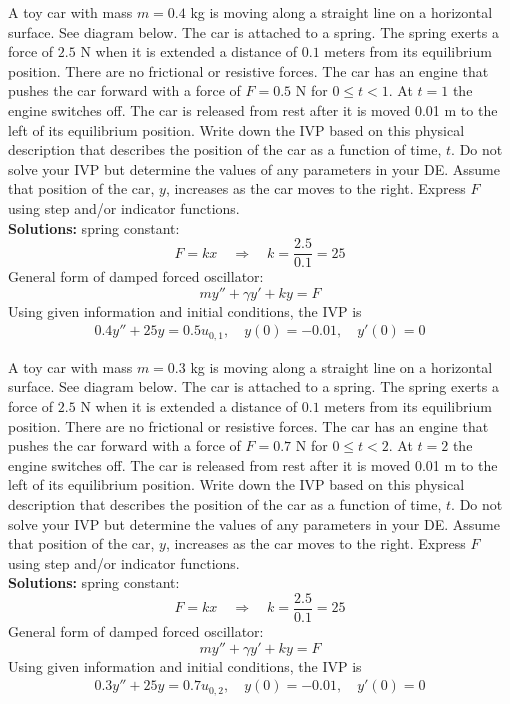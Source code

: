 \ifnum {}
\question[2] A toy car with mass $m = 0.4$ kg is moving along a straight line on a horizontal surface. See diagram below. The car is attached to a spring. The spring exerts a force of $2.5$ N when it is extended a distance of $0.1$ meters from its equilibrium position. There are no frictional or resistive forces. The car has an engine that pushes the car forward with a force of $F = 0.5$ N for $0 \le t < 1$. At $t = 1$ the engine switches off. The car is released from rest after it is moved 0.01 m to the left of its equilibrium position. Write down the IVP based on this physical description that describes the position of the car as a function of time, $t$. Do not solve your IVP but determine the values of any parameters in your DE. Assume that position of the car, $y$, increases as the car moves to the right. Express $F$ using step and/or indicator functions. \\


\ifnum {} {\color{DarkBlue} 
\textbf{Solutions:} spring constant:
$$F = kx \quad \Rightarrow \quad k = \frac{2.5}{0.1} = 25$$
General form of damped forced oscillator:
$$my'' + \gamma y' + ky = F$$
Using given information and initial conditions, the IVP is
\begin{align}
    0.4 y'' + 25y = 0.5u_{0,1}, \quad y(0) = -0.01, \quad y'(0) = 0
\end{align}
} 
\else 
\vfill
\fi
\fi 


\ifnum {}
\question[2] A toy car with mass $m = 0.3$ kg is moving along a straight line on a horizontal surface. See diagram below. The car is attached to a spring. The spring exerts a force of $2.5$ N when it is extended a distance of $0.1$ meters from its equilibrium position. There are no frictional or resistive forces. The car has an engine that pushes the car forward with a force of $F = 0.7$ N for $0 \le t < 2$. At $t = 2$ the engine switches off. The car is released from rest after it is moved 0.01 m to the left of its equilibrium position. Write down the IVP based on this physical description that describes the position of the car as a function of time, $t$. Do not solve your IVP but determine the values of any parameters in your DE. Assume that position of the car, $y$, increases as the car moves to the right. Express $F$ using step and/or indicator functions. \\


\ifnum {} {\color{DarkBlue} 
\textbf{Solutions:} spring constant:
$$F = kx \quad \Rightarrow \quad k = \frac{2.5}{0.1} = 25$$
General form of damped forced oscillator:
$$my'' + \gamma y' + ky = F$$
Using given information and initial conditions, the IVP is
\begin{align}
    0.3 y'' + 25y = 0.7u_{0,2}, \quad y(0) = -0.01, \quad y'(0) = 0
\end{align}
} 
\else 
\vfill
\fi
\fi 


